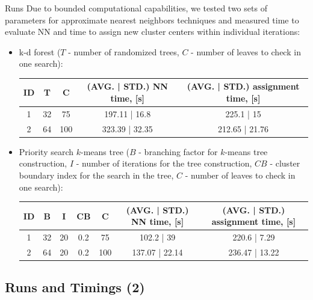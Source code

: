 \begin{frame}
	\begin{block}{Runs}
		Due to bounded computational capabilities, we tested two sets of parameters for approximate nearest neighbors techniques and measured time to evaluate NN and time to assign new cluster centers within individual iterations:
		
		\begin{itemize}
			\item k-d forest ($T$ - number of randomized trees, $C$ - number of leaves to check in one search):
			\begin{table}
				\scriptsize
				\begin{tabular}{| c || c | c | c | c |}
					\hline
					ID & T & C & (AVG. | STD.) NN time, [s] & (AVG. | STD.) assignment time, [s] \\
					\hline
					\hline			
					1 & 32 & 75 & 197.11 | 16.8 & 225.1 | 15 \\
					2 & 64 & 100 & 323.39 | 32.35 & 212.65 | 21.76 \\
					\hline  
				\end{tabular}
			\end{table}
			\item Priority search $k$-means tree ($B$ - branching factor for $k$-means tree construction, $I$ - number of iterations for the tree construction, $CB$ - cluster boundary index for the search in the tree, $C$ - number of leaves to check in one search):
			\begin{table}
				\scriptsize
				\begin{tabular}{| c || c | c | c | c | c | c |}
					\hline
					ID & B & I & CB & C & (AVG. | STD.) NN time, [s] & (AVG. | STD.) assignment time, [s] \\
					\hline
					\hline			
					1 & 32 & 20 & 0.2 & 75 & 102.2 | 39 & 220.6 | 7.29 \\
					2 & 64 & 20 & 0.2 & 100 & 137.07 | 22.14 & 236.47 | 13.22 \\
					\hline  
				\end{tabular}
			\end{table}
		\end{itemize}
	\end{block}
\end{frame}

\subsection{Runs and Timings (2)}

